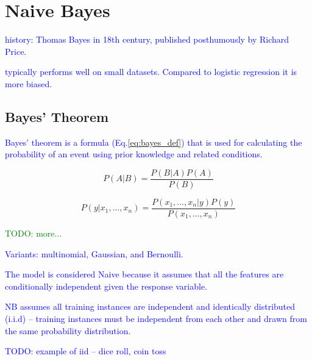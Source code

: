 \section{Naive Bayes}

\textcolor{blue}{history: Thomas Bayes in 18th century, published posthumously by Richard Price.}

\textcolor{blue}{typically performs well on small datasets. Compared to logistic regression it is more biased.}

\subsection{Bayes' Theorem}

\textcolor{blue}{Bayes' theorem is a formula (Eq.\ref{eq:bayes_def}) that is used for calculating the probability of an event using prior knowledge and related conditions.}

\begin{equation}
{P(A|B)=\frac{P(B|A)P(A)}{P(B)}}
\label{eq:bayes_def}
\end{equation}

\begin{equation}
{P(y|x_1,\dots,x_n)=\frac{P(x_1,\dots,x_n|y)P(y)}{P(x_1,\dots,x_n)}}
\label{eq:bayes_exp_def}
\end{equation}

\textcolor{green}{TODO: more...}

\textcolor{blue}{Variants: multinomial, Gaussian, and Bernoulli.}


\textcolor{blue}{The model is considered Naive because it assumes that all the features are conditionally independent given the response variable.}


\textcolor{blue}{NB assumes all training instances are {independent and identically distributed (i.i.d)} -- training instances must be independent from each other and drawn from the same probability distribution.}

\textcolor{blue}{TODO: example of iid -- dice roll, coin toss}

